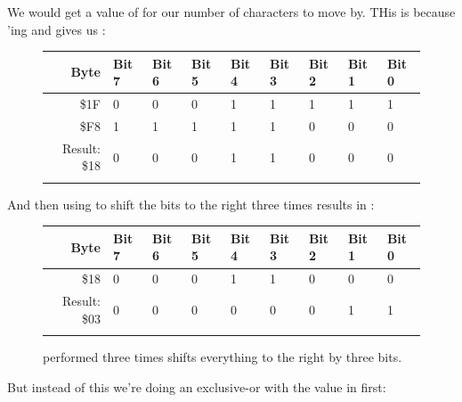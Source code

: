 We would get a value of  for our number of characters to move by. THis is because 'ing
 and  gives us :


\begin{figure}[H]
  {
    \setlength{\tabcolsep}{3.0pt}
    \setlength\cmidrulewidth{\heavyrulewidth} %
    \begin{adjustbox}{width=6cm,center}

      \begin{tabular}{rllllllll}
        \toprule
        Byte & Bit 7 & Bit 6 & Bit 5 & Bit 4 & Bit 3 & Bit 2 & Bit 1 & Bit 0        \\
        \midrule
        \$1F & 0 & 0 & 0 & 1 & 1 & 1 & 1 & 1 \\
        \$F8 & 1 & 1 & 1 & 1 & 1 & 0 & 0 & 0 \\
        \midrule
        Result: \$18 & 0 & 0 & 0 & 1 & 1 & 0 & 0 & 0 \\
        \addlinespace
        \bottomrule
      \end{tabular}
    \end{adjustbox}
  }
\end{figure}

And then using  to shift the bits to the right three times results in :

\begin{figure}[H]
  {
    \setlength{\tabcolsep}{3.0pt}
    \setlength\cmidrulewidth{\heavyrulewidth} %
    \begin{adjustbox}{width=6cm,center}

      \begin{tabular}{rllllllll}
        \toprule
        Byte & Bit 7 & Bit 6 & Bit 5 & Bit 4 & Bit 3 & Bit 2 & Bit 1 & Bit 0        \\
        \midrule
        \$18 & 0 & 0 & 0 & 1 & 1 & 0 & 0 & 0 \\
        \midrule
        Result: \$03 & 0 & 0 & 0 & 0 & 0 & 0 & 1 & 1 \\
        \addlinespace
        \bottomrule
      \end{tabular}
    \end{adjustbox}
  }\caption{ performed three times shifts everything to the right by three bits.}
\end{figure}

But instead of this we're doing an exclusive-or with the value in  first:

